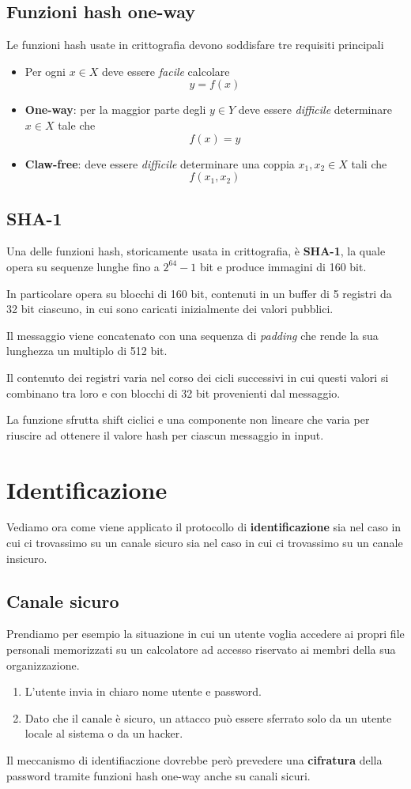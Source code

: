 \subsection{Funzioni hash one-way}
Le funzioni hash usate in crittografia devono soddisfare tre requisiti principali
\begin{itemize}
	\item Per ogni $x \in X$ deve essere \emph{facile} calcolare
	      \[ y = f(x) \]
	\item \textbf{One-way}: per la maggior parte degli $y \in Y$ deve essere \emph{difficile} determinare $x \in X$
	      tale che
	      \[ f(x) = y \]
	\item \textbf{Claw-free}: deve essere \emph{difficile} determinare una coppia $x_1, x_2 \in X$ tali che
	      \[ f(x_1, x_2) \]
\end{itemize}

\subsection{SHA-1}
Una delle funzioni hash, storicamente usata in crittografia, \`e \textbf{SHA-1}, la quale opera su sequenze lunghe
fino a $2^{64} - 1$ bit e produce immagini di 160 bit.

In particolare opera su blocchi di 160 bit, contenuti in un buffer di 5 registri da 32 bit ciascuno, in cui sono
caricati inizialmente dei valori pubblici.

Il messaggio viene concatenato con una sequenza di \emph{padding} che rende la sua lunghezza un multiplo di 512 bit.

Il contenuto dei registri varia nel corso dei cicli successivi in cui questi valori si combinano tra loro e con
blocchi di 32 bit provenienti dal messaggio.

La funzione sfrutta shift ciclici e una componente non lineare che varia per riuscire ad ottenere il valore hash per
ciascun messaggio in input.

\section{Identificazione}
Vediamo ora come viene applicato il protocollo di \textbf{identificazione} sia nel caso in cui ci trovassimo su un
canale sicuro sia nel caso in cui ci trovassimo su un canale insicuro.

\subsection{Canale sicuro}
Prendiamo per esempio la situazione in cui un utente voglia accedere ai propri file personali memorizzati su un
calcolatore ad accesso riservato ai membri della sua organizzazione.
\begin{enumerate}
	\item L'utente invia in chiaro nome utente e password.
	\item Dato che il canale \`e sicuro, un attacco pu\`o essere sferrato solo da un utente locale al sistema o da
	      un hacker.
\end{enumerate}
Il meccanismo di identifiaczione dovrebbe per\`o prevedere una \textbf{cifratura} della password tramite funzioni hash
one-way anche su canali sicuri.

